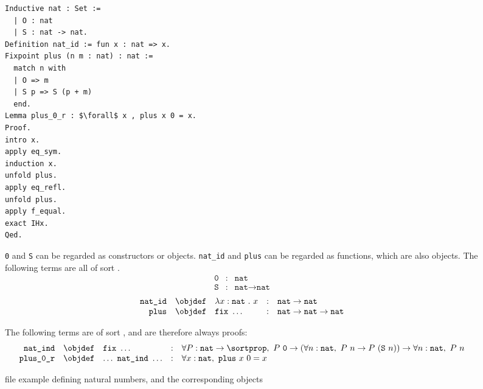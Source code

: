 \begin{figure}[H]
	\begin{lstlisting}[language=Coq, mathescape]
Inductive nat : Set :=
  | O : nat
  | S : nat -> nat.
Definition nat_id := fun x : nat => x.
Fixpoint plus (n m : nat) : nat :=
  match n with
  | O => m
  | S p => S (p + m)
  end.
Lemma plus_0_r : $\forall$ x , plus x 0 = x.
Proof.
intro x.
apply eq_sym.
induction x.
unfold plus.
apply eq_refl.
unfold plus.
apply f_equal.
exact IHx.
Qed.
	\end{lstlisting}
	\texttt{0} and \texttt{S} can be regarded as constructors or objects. \texttt{nat\_id} and \texttt{plus} can be regarded as functions, which are also objects.
	The following terms are all of sort \sortset.
	$$
		\begin{array}{rcl}
			\texttt{0} & : & \texttt{nat} \\
			\texttt{S} & : & \texttt{nat} \rightarrow \texttt{nat}
		\end{array}
	$$
	$$
		\begin{array}{rclcl}
			\texttt{nat\_id} & \objdef & \lambda x : \texttt{nat}~.~x & : & \texttt{nat} \rightarrow \texttt{nat} \\
			\texttt{plus} & \objdef & \texttt{fix}~\ldots & : & \texttt{nat} \rightarrow \texttt{nat} \rightarrow \texttt{nat} \\
		\end{array}
	$$

	The following terms are of sort \sortprop, and are therefore always proofs:
	$$
		\begin{array}{rclcl}
			\texttt{nat\_ind} & \objdef & \texttt{fix}~\ldots & : &
				\forall P : \texttt{nat} \rightarrow \sortprop,~
				P~\texttt{0} \rightarrow (\forall n : \texttt{nat},~ P~n \rightarrow P~(\texttt{S}~n)) \rightarrow \forall n : \texttt{nat},~ P~n \\
			\texttt{plus\_0\_r} & \objdef & \ldots~\texttt{nat\_ind}~\ldots & : & \forall x : \texttt{nat},~ \texttt{plus}~x~0 = x
		\end{array}
	$$
	\caption{\coq file example defining natural numbers, and the corresponding \coq objects}
	\label{figure:natexample}
\end{figure}
